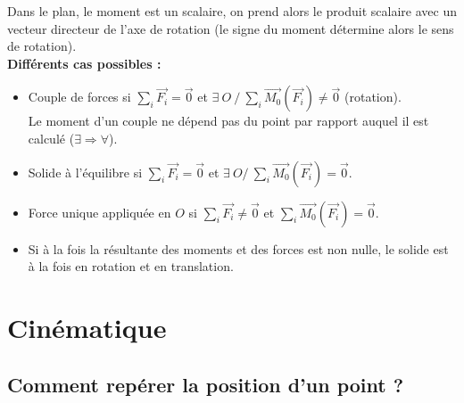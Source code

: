 \documentclass[13pt, twoside, a4paper, french]{report}
\begin{document}
            Dans le plan, le moment est un scalaire, on prend alors le produit scalaire avec un vecteur directeur de l'axe de rotation (le signe du moment détermine alors le sens de rotation).\\

            \textbf{Différents cas possibles :}
            \begin{itemize}
                \item Couple de forces si $\sum_i \overrightarrow{F_i} = \vec 0$ et $\exists\ O\ /\ \sum_i \overrightarrow{M_0}(\overrightarrow{F_i}) \neq \vec 0$ (rotation).\\Le moment d’un couple ne dépend pas du point par rapport auquel il est calculé ($\exists \Rightarrow \forall$).
                \item Solide à l'équilibre si $\sum_i \overrightarrow{F_i} = \vec 0$ et $\exists\ O /\ \sum_i \overrightarrow{M_0}(\overrightarrow{F_i}) = \vec 0$.
                \item Force unique appliquée en $O$ si $\sum_i \overrightarrow{F_i} \neq \vec 0$ et $\sum_i \overrightarrow{M_0}(\overrightarrow{F_i}) = \vec 0$.
                \item Si à la fois la résultante des moments et des forces est non nulle, le solide est à la fois en rotation et en translation.
            \end{itemize}


    \chapter{Cinématique}\label{ch:cinematique}


        \section{Comment repérer la position d’un point ?}\label{sec:comment-reperer-la-position-dun-point-?}

\end{document}
